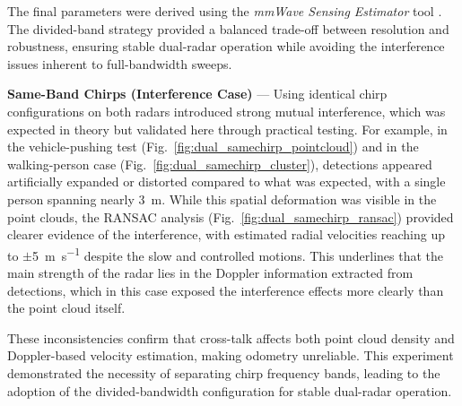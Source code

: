 The final parameters were derived using the \textit{mmWave Sensing Estimator} tool \cite{mmwave_demo_output}.  
The divided-band strategy provided a balanced trade-off between resolution and robustness, ensuring stable dual-radar operation while avoiding the interference issues inherent to full-bandwidth sweeps.

\textbf{Same-Band Chirps (Interference Case)} — Using identical chirp configurations on both radars introduced strong mutual interference, which was expected in theory but validated here through practical testing.  
For example, in the vehicle-pushing test (Fig.~\ref{fig:dual_samechirp_pointcloud}) and in the walking-person case (Fig.~\ref{fig:dual_samechirp_cluster}), detections appeared artificially expanded or distorted compared to what was expected, with a single person spanning nearly \SI{3}{\meter}.  
While this spatial deformation was visible in the point clouds, the RANSAC analysis (Fig.~\ref{fig:dual_samechirp_ransac}) provided clearer evidence of the interference, with estimated radial velocities reaching up to $\pm$\SI{5}{\meter\per\second} despite the slow and controlled motions.  
This underlines that the main strength of the radar lies in the Doppler information extracted from detections, which in this case exposed the interference effects more clearly than the point cloud itself.  

These inconsistencies confirm that cross-talk affects both point cloud density and Doppler-based velocity estimation, making odometry unreliable.  
This experiment demonstrated the necessity of separating chirp frequency bands, leading to the adoption of the divided-bandwidth configuration for stable dual-radar operation.

